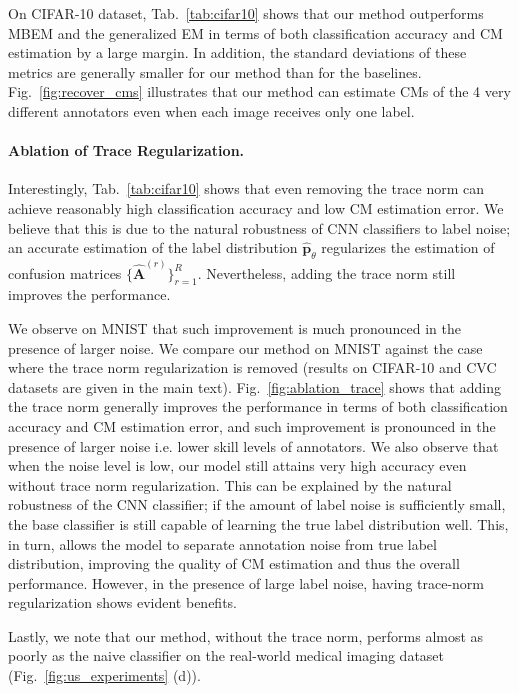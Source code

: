 On CIFAR-10 dataset, Tab.~\ref{tab:cifar10} shows that our method outperforms MBEM and the generalized EM in terms of both classification accuracy and CM estimation by a large margin. In addition, the standard deviations of these metrics are generally smaller for our method than for the baselines. Fig.~\ref{fig:recover_cms} illustrates that our method can estimate CMs of the 4 very different annotators even when each image receives only one label. 

\paragraph{Ablation of Trace Regularization.}

Interestingly, Tab.~\ref{tab:cifar10} shows that even removing the trace norm can achieve reasonably high classification accuracy and low CM estimation error. We believe that this is due to the natural robustness of CNN classifiers to label noise; an accurate estimation of the label distribution $\hat{\textbf{p}}_\theta$ regularizes the estimation of confusion matrices $\{\hat{\textbf{A}}^{(r)}\}_{r=1}^R$. Nevertheless, adding the trace norm still improves the performance. 

We observe on MNIST that such improvement is much pronounced in the presence of larger noise. We compare our method on MNIST against the case where the trace norm regularization is removed (results on CIFAR-10 and CVC datasets are given in the main text). Fig.~\ref{fig:ablation_trace} shows that adding the trace norm generally improves the performance in terms of both classification accuracy and CM estimation error, and such improvement is pronounced in the presence of larger noise i.e. lower skill levels of annotators. We also observe that when the noise level is low, our model still attains very high accuracy even without trace norm regularization. This can be explained by the natural robustness of the CNN classifier; if the amount of label noise is sufficiently small, the base classifier is still capable of learning the true label distribution well. This, in turn, allows the model to separate annotation noise from true label distribution, improving the quality of CM estimation and thus the overall performance. However, in the presence of large label noise, having trace-norm regularization shows evident benefits. 

Lastly, we note that our method, without the trace norm, performs almost as poorly as the naive classifier on the real-world medical imaging dataset (Fig.~\ref{fig:us_experiments} (d)).


